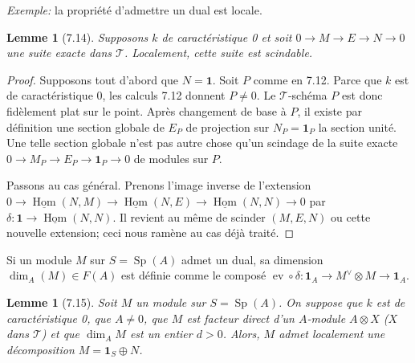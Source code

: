 \documentclass[12pt,a4paper]{article}
\theoremstyle{plain}
\newtheorem{lemma}[theorem]{Lemme}
\theoremstyle{definition}
\DeclareMathOperator{\Sp}{Sp}
\DeclareMathOperator{\Hom}{Hom}
\DeclareMathOperator{\ev}{ev}
\begin{document}
\textit{Exemple:} la propriété d'admettre un dual est locale.

\begin{lemma}[7.14]
Supposons $k$ de caractéristique 0 et soit $0 \to M \to E \to N \to 0$ une suite exacte dans $\mathcal{T}$. Localement, cette suite est scindable.
\end{lemma}

\begin{proof}
Supposons tout d'abord que $N = \mathbf{1}$. Soit $P$ comme en 7.12. Parce que $k$ est de caractéristique 0, les calculs 7.12 donnent $P \neq 0$. Le $\mathcal{T}$-schéma $P$ est donc fidèlement plat sur le point. Après changement de base à $P$, il existe par définition une section globale de $E_P$ de projection sur $N_P = \mathbf{1}_P$ la section unité. Une telle section globale n'est pas autre chose qu'un scindage de la suite exacte $0 \to M_P \to E_P \to \mathbf{1}_P \to 0$ de modules sur $P$.

Passons au cas général. Prenons l'image inverse de l'extension $0 \to \underline{\Hom}(N, M) \to \underline{\Hom}(N, E) \to \underline{\Hom}(N, N) \to 0$ par $\delta : \mathbf{1} \to \underline{\Hom}(N, N)$. Il revient au même de scinder $(M, E, N)$ ou cette nouvelle extension; ceci nous ramène au cas déjà traité.
\end{proof}

Si un module $M$ sur $S = \Sp(A)$ admet un dual, sa dimension $\dim_A(M) \in F(A)$ est définie comme le composé $\ev \circ \delta : \mathbf{1}_A \to M^\vee \otimes M \to \mathbf{1}_A$.

\begin{lemma}[7.15]
Soit $M$ un module sur $S = \Sp(A)$. On suppose que $k$ est de caractéristique 0, que $A \neq 0$, que $M$ est facteur direct d'un $A$-module $A \otimes X$ ($X$ dans $\mathcal{T}$) et que $\dim_A M$ est un entier $d > 0$. Alors, $M$ admet localement une décomposition $M = \mathbf{1}_S \oplus N$.
\end{lemma}
\end{document}
